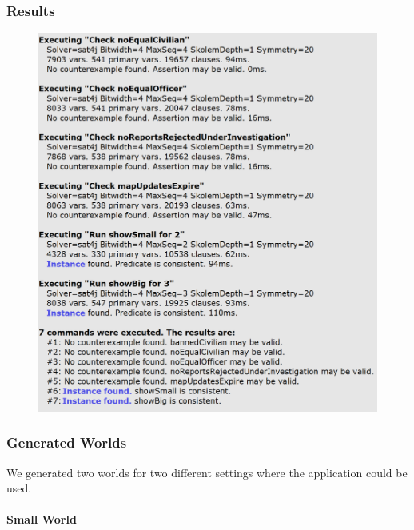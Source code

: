 \documentclass[12pt,a4paper]{article}
\begin{document}
\subsubsection{Results}
\begin{figure}[H]
\begin{adjustwidth}{-25mm}{-25mm}
				\centering
				\includegraphics[width=.6\paperwidth,height=.6\paperheight, keepaspectratio]{Images/Alloy/results}
\end{adjustwidth}
\end{figure}
\newpage
\subsubsection{Generated Worlds}
We generated two worlds for two different settings where the application could be used.\\\\
\textbf{\large{Small World}}
\end{document}
